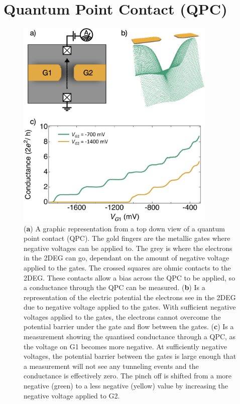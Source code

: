 \afterpage{\clearpage}
\section{Quantum Point Contact (QPC)}

\begin{figure}[!htb]
 \begin{center}
  \includegraphics[width=0.85\textwidth]{figures/ch1/crop_FiguresMaster.003.png}
  \caption[Conductance through a quantum point contact]{\label{fig:ch1/qpc_intro} 
  (\textbf{a}) A graphic representation from a top down view of a quantum point contact (QPC). The gold fingers are the metallic gates where negative voltages can be applied to. The grey is where the electrons in the 2DEG can go, dependant on the amount of negative voltage applied to the gates. The crossed squares are ohmic contacts to the 2DEG. These contacts allow a bias across the QPC to be applied, so a conductance through the QPC can be measured. (\textbf{b}) Is a representation of the electric potential the electrons see in the 2DEG due to negative voltage applied to the gates. With sufficient negative voltages applied to the gates, the electrons cannot overcome the potential barrier under the gate and flow between the gates. (\textbf{c}) Is a measurement showing the quantised conductance through a QPC, as the voltage on G1 becomes more negative. At sufficiently negative voltages, the potential barrier between the gates is large enough that a measurement will not see any tunneling events and the conductance is effectively zero. The pinch off is shifted from a more negative (green) to a less negative (yellow) value by increasing the negative voltage applied to G2.
   }
 \end{center}
\end{figure}

